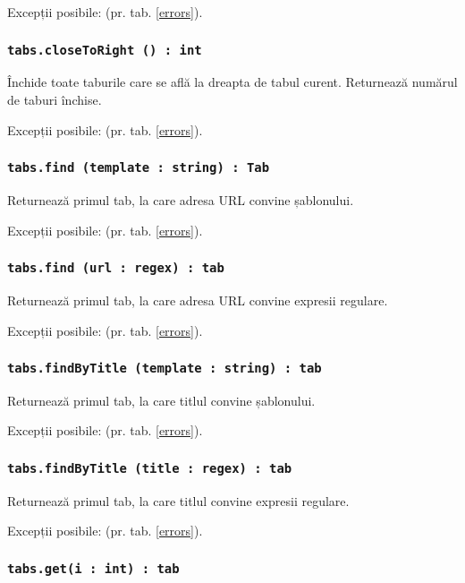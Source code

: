 Excepții posibile:  (pr. tab. \ref{errors}).

\subsubsection{\texttt{tabs.closeToRight () : int}}

Închide toate taburile care se află la dreapta de tabul curent. Returnează numărul de taburi închise.

Excepții posibile:  (pr. tab. \ref{errors}).

\subsubsection{\texttt{tabs.find (template : string) : Tab}}

Returnează primul tab, la care adresa URL convine șablonului.

Excepții posibile:  (pr. tab. \ref{errors}).

\subsubsection{\texttt{tabs.find (url : regex) : tab}}

Returnează primul tab, la care adresa URL convine expresii regulare.

Excepții posibile:  (pr. tab. \ref{errors}).

\subsubsection{\texttt{tabs.findByTitle (template : string) : tab}}

Returnează primul tab, la care titlul convine șablonului.

Excepții posibile:  (pr. tab. \ref{errors}).

\subsubsection{\texttt{tabs.findByTitle (title : regex) : tab}}

Returnează primul tab, la care titlul convine expresii regulare.

Excepții posibile:  (pr. tab. \ref{errors}).

\subsubsection{\texttt{tabs.get(i : int) : tab}}

